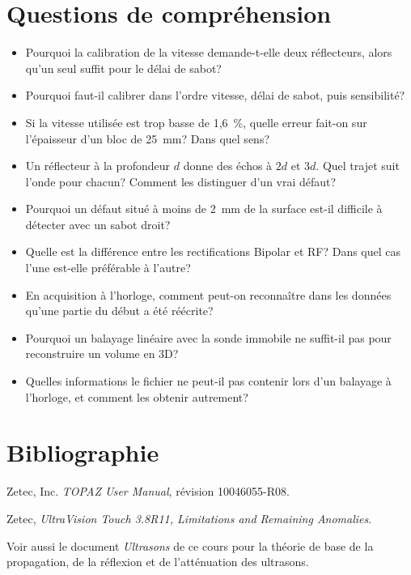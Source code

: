 \documentclass[11pt,letterpaper]{article}
\begin{document}
\section{Questions de compr\'ehension}

\begin{itemize}
  \item Pourquoi la calibration de la vitesse demande-t-elle deux r\'eflecteurs, alors qu'un seul suffit pour le d\'elai de sabot?
  \item Pourquoi faut-il calibrer dans l'ordre vitesse, d\'elai de sabot, puis sensibilit\'e?
  \item Si la vitesse utilis\'ee est trop basse de 1,6~\%, quelle erreur fait-on sur l'\'epaisseur d'un bloc de 25~mm? Dans quel sens?
  \item Un r\'eflecteur \`a la profondeur $d$ donne des \'echos \`a $2d$ et $3d$. Quel trajet suit l'onde pour chacun? Comment les distinguer d'un vrai d\'efaut?
  \item Pourquoi un d\'efaut situ\'e \`a moins de 2~mm de la surface est-il difficile \`a d\'etecter avec un sabot droit?
  \item Quelle est la diff\'erence entre les rectifications Bipolar et RF? Dans quel cas l'une est-elle pr\'ef\'erable \`a l'autre?
  \item En acquisition \`a l'horloge, comment peut-on reconna\^itre dans les donn\'ees qu'une partie du d\'ebut a \'et\'e r\'e\'ecrite?
  \item Pourquoi un balayage lin\'eaire avec la sonde immobile ne suffit-il pas pour reconstruire un volume en 3D?
  \item Quelles informations le fichier ne peut-il pas contenir lors d'un balayage \`a l'horloge, et comment les obtenir autrement?
\end{itemize}


\section{Bibliographie}

Zetec, Inc. \emph{TOPAZ User Manual}, r\'evision 10046055-R08.

Zetec, \emph{UltraVision Touch 3.8R11, Limitations and Remaining Anomalies}.

Voir aussi le document \emph{Ultrasons} de ce cours pour la th\'eorie de base de la propagation, de la r\'eflexion et de l'att\'enuation des ultrasons.
\end{document}
